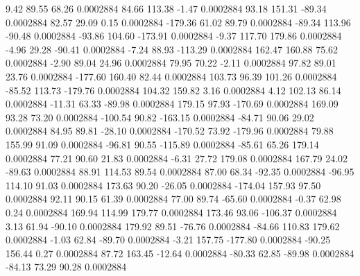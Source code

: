         9.42       89.55       68.26     0.0002884
       84.66      113.38       -1.47     0.0002884
       93.18      151.31      -89.34     0.0002884
       82.57       29.09        0.15     0.0002884
     -179.36       61.02       89.79     0.0002884
      -89.34      113.96      -90.48     0.0002884
      -93.86      104.60     -173.91     0.0002884
       -9.37      117.70      179.86     0.0002884
       -4.96       29.28      -90.41     0.0002884
       -7.24       88.93     -113.29     0.0002884
      162.47      160.88       75.62     0.0002884
       -2.90       89.04       24.96     0.0002884
       79.95       70.22       -2.11     0.0002884
       97.82       89.01       23.76     0.0002884
     -177.60      160.40       82.44     0.0002884
      103.73       96.39      101.26     0.0002884
      -85.52      113.73     -179.76     0.0002884
      104.32      159.82        3.16     0.0002884
        4.12      102.13       86.14     0.0002884
      -11.31       63.33      -89.98     0.0002884
      179.15       97.93     -170.69     0.0002884
      169.09       93.28       73.20     0.0002884
     -100.54       90.82     -163.15     0.0002884
      -84.71       90.06       29.02     0.0002884
       84.95       89.81      -28.10     0.0002884
     -170.52       73.92     -179.96     0.0002884
       79.88      155.99       91.09     0.0002884
      -96.81       90.55     -115.89     0.0002884
      -85.61       65.26      179.14     0.0002884
       77.21       90.60       21.83     0.0002884
       -6.31       27.72      179.08     0.0002884
      167.79       24.02      -89.63     0.0002884
       88.91      114.53       89.54     0.0002884
       87.00       68.34      -92.35     0.0002884
      -96.95      114.10       91.03     0.0002884
      173.63       90.20      -26.05     0.0002884
     -174.04      157.93       97.50     0.0002884
       92.11       90.15       61.39     0.0002884
       77.00       89.74      -65.60     0.0002884
       -0.37       62.98        0.24     0.0002884
      169.94      114.99      179.77     0.0002884
      173.46       93.06     -106.37     0.0002884
        3.13       61.94      -90.10     0.0002884
      179.92       89.51      -76.76     0.0002884
      -84.66      110.83      179.62     0.0002884
       -1.03       62.84      -89.70     0.0002884
       -3.21      157.75     -177.80     0.0002884
      -90.25      156.44        0.27     0.0002884
       87.72      163.45      -12.64     0.0002884
      -80.33       62.85      -89.98     0.0002884
      -84.13       73.29       90.28     0.0002884
